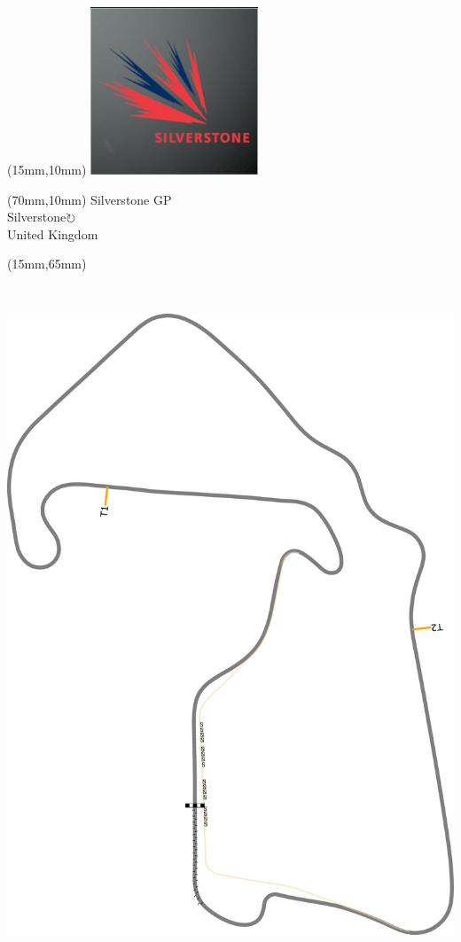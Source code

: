 \null\newpage
\begin{textblock*}{50mm}(15mm,10mm)%
\includegraphics[width=50mm]{LG/2015-05-20_00094.png}
\end{textblock*}
\begin{textblock*}{130mm}(70mm,10mm)%
{\fontsize{20}{20}\selectfont Silverstone GP\\}
{\fontsize{16}{16}\selectfont Silverstone\hfill \Large$\circlearrowright$\\}
{\fontsize{12}{12}\selectfont United Kingdom\\}
\end{textblock*}
\begin{textblock*}{185mm}(15mm,65mm)%
\centering
\mbox{\includegraphics[width=185mm,height=210mm,keepaspectratio]{PT/SIGP.pdf}}
\end{textblock*}

